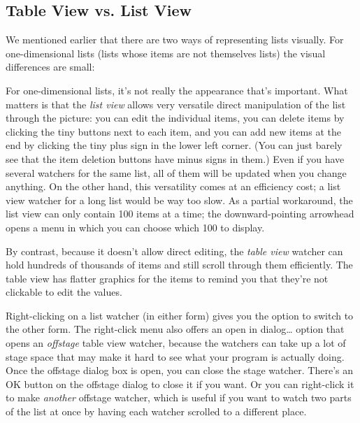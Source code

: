 \subsection*{}\label{section-2}

\subsection{Table View vs. List View}\label{table-view-vs.-list-view}

We mentioned earlier that there are two ways of representing lists
visually. For one-dimensional lists (lists whose items are not
themselves lists) the visual differences are small:

For one-dimensional lists, it's not really the appearance that's
important. What matters is that the \emph{list view} allows very
versatile direct manipulation of the list through the picture: you can
edit the individual items, you can delete items by clicking the tiny
buttons next to each item, and you can add new items at the end by
clicking the tiny plus sign in the lower left corner. (You can just
barely see that the item deletion buttons have minus signs in them.)
Even if you have several watchers for the same list, all of them will be
updated when you change anything. On the other hand, this versatility
comes at an efficiency cost; a list view watcher for a long list would
be way too slow. As a partial workaround, the list view can only contain
100 items at a time; the downward-pointing arrowhead opens a menu in
which you can choose which 100 to display.

By contrast, because it doesn't allow direct editing, the \emph{table
view} watcher can hold hundreds of thousands of items and still scroll
through them efficiently. The table view has flatter graphics for the
items to remind you that they're not clickable to edit the values.

Right-clicking on a list watcher (in either form) gives you the option
to switch to the other form. The right-click menu also offers an open in
dialog\ldots{} option that opens an \emph{offstage} table view watcher,
because the watchers can take up a lot of stage space that may make it
hard to see what your program is actually doing. Once the offstage
dialog box is open, you can close the stage watcher. There's an OK
button on the offstage dialog to close it if you want. Or you can
right-click it to make \emph{another} offstage watcher, which is useful
if you want to watch two parts of the list at once by having each
watcher scrolled to a different place.


